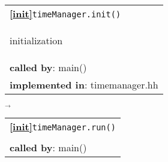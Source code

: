 \begin{landscape}
{%
  \begin{tabular}{|l|} \hline
    \textbf{\textcircled{\ref{init}}}\verb+timeManager.init()+ \\
    \begin{scriptsize}initialization\end{scriptsize}\\
    \textbf{called by}: main() \\
    \textbf{implemented in}: timemanager.hh \\  
    \hline
  \end{tabular}
    $\overrightarrow{}$
  \begin{tabular}{|l|}\hline
    \textbf{\textcircled{\ref{init}}}\verb+timeManager.run()+\\ 
    \begin{scriptsize}\end{scriptsize}\\
    \textbf{called by}: {main()}\\

\end{tabular}}
\end{landscape}
